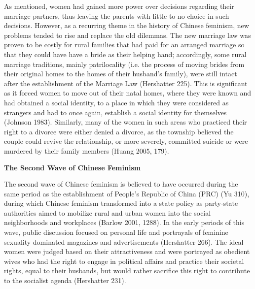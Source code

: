 \documentclass[12pt]{article}
\begin{document}
\begin{flushleft}
		As mentioned, women had gained more power over decisions regarding their marriage partners, thus leaving the parents with little to no choice in such decisions. However, as a recurring theme in the history of Chinese feminism, new problems tended to rise and replace the old dilemmas. The new marriage law was proven to be costly for rural families that had paid for an arranged marriage so that they could have have a bride as their helping hand; accordingly, some rural marriage traditions, mainly patrilocality (i.e. the process of moving brides from their original homes to the homes of their husband’s family), were still intact after the establishment of the Marriage Law (Hershatter 225). This is significant as it forced women to move out of their natal homes, where they were known and had obtained a social identity, to a place in which they were considered as strangers and had to once again, establish a social identity for themselves (Johnson 1983). Similarly, many of the women in such areas who practiced their right to a divorce were either denied a divorce, as the township believed the couple could revive the relationship, or more severely, committed suicide or were murdered by their family members (Huang 2005, 179). 
		
		\vspace{0.3cm}
		\noindent \textbf{The Second Wave of Chinese Feminism}
		
		\noindent 
		The second wave of Chinese feminism is believed to have occurred during the same period as the establishment of People’s Republic of China (PRC) (Yu 310), during which Chinese feminism transformed into a state policy as party-state authorities aimed to mobilize rural and urban women into the social neighborhoods and workplaces (Barlow 2001, 1288). In the early periods of this wave, public discussion focused on personal life and portrayals of feminine sexuality dominated magazines and advertisements (Hershatter 266). The ideal women were judged based on their attractiveness and were portrayed as obedient wives who had the right to engage in political affairs and practice their societal rights, equal to their husbands, but would rather sacrifice this right to contribute to the socialist agenda (Hershatter 231). 
		

\end{flushleft}
\end{document}
